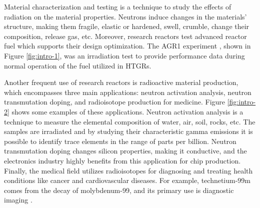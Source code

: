 Material characterization and testing is a technique to study the effects of radiation on the material properties.
Neutrons induce changes in the materials' structure, making them fragile, elastic or hardened, swell, crumble, change their composition, release gas, etc.
Moreover, research reactors test advanced reactor fuel which supports their design optimization.
The \gls*{AGR1} experiment \cite{sterbentz_agr1_2018}, shown in Figure \ref{fig:intro-1}, was an irradiation test to provide performance data during normal operation of the fuel utilized in \glspl*{HTGR}.

Another frequent use of research reactors is radioactive material production, which encompasses three main applications: neutron activation analysis, neutron transmutation doping, and radioisotope production for medicine.
Figure \ref{fig:intro-2} shows some examples of these applications.
Neutron activation analysis is a technique to measure the elemental composition of water, air, soil, rocks, etc.
The samples are irradiated and by studying their characteristic gamma emissions it is possible to identify trace elements in the range of parts per billion.
Neutron transmutation doping changes silicon properties, making it conductive, and the electronics industry highly benefits from this application for chip production.
Finally, the medical field utilizes radioisotopes for diagnosing and treating health conditions like cancer and cardiovascular diseases.
For example, technetium-99m comes from the decay of molybdenum-99, and its primary use is diagnostic imaging \cite{mattar_exploring_2019}.


